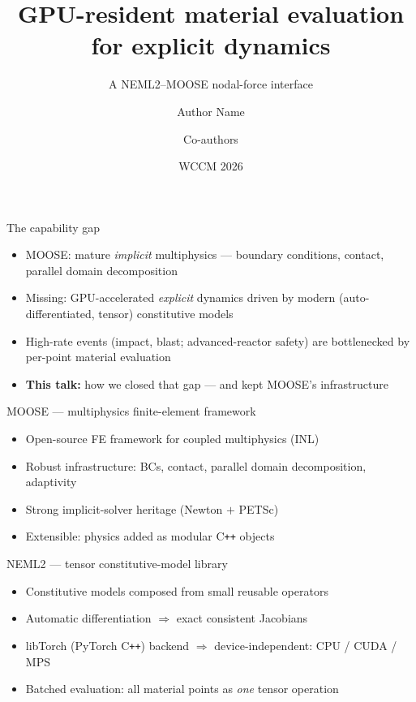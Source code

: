 \documentclass[aspectratio=169,11pt]{beamer}
\title{GPU-resident material evaluation for explicit dynamics}
\subtitle{A NEML2--MOOSE nodal-force interface}
\author{Author Name \and Co-authors}
\institute{Idaho National Laboratory / \ldots}
\date{WCCM 2026 \quad\textbar\quad [session] \quad\textbar\quad [date]}
\begin{document}
{\begin{frame}[plain]\titlepage\end{frame}}

\begin{frame}{The capability gap}
\begin{itemize}
  \item MOOSE: mature \emph{implicit} multiphysics --- boundary conditions, contact, parallel domain decomposition
  \item Missing: GPU-accelerated \emph{explicit} dynamics driven by modern (auto-differentiated, tensor) constitutive models
  \item High-rate events (impact, blast; advanced-reactor safety) are bottlenecked by per-point material evaluation
  \item \textbf{This talk:} how we closed that gap --- and kept MOOSE's infrastructure
\end{itemize}
\end{frame}

\begin{frame}{MOOSE --- multiphysics finite-element framework}
\begin{itemize}
  \item Open-source FE framework for coupled multiphysics (INL)
  \item Robust infrastructure: BCs, contact, parallel domain decomposition, adaptivity
  \item Strong implicit-solver heritage (Newton $+$ PETSc)
  \item Extensible: physics added as modular C\texttt{++} objects
\end{itemize}
\end{frame}

\begin{frame}{NEML2 --- tensor constitutive-model library}
\begin{itemize}
  \item Constitutive models composed from small reusable operators
  \item Automatic differentiation $\Rightarrow$ exact consistent Jacobians
  \item libTorch (PyTorch C\texttt{++}) backend $\Rightarrow$ device-independent: CPU / CUDA / MPS
  \item Batched evaluation: all material points as \emph{one} tensor operation
\end{itemize}
\end{frame}
\end{document}
